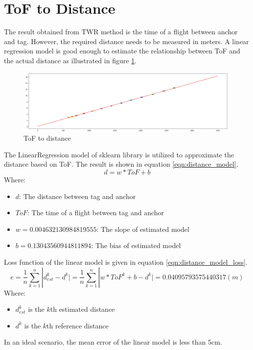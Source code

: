 \documentclass[\main/main.tex]{subfiles}
\begin{document}
\section{ToF to Distance}
The result obtained from TWR method is the time of a flight between anchor and tag. However, the required distance needs to be measured in meters. A linear regression model is good enough to estimate the relationship between ToF and the actual distance as illustrated in figure \ref{fig:tof_to_distance}.
\begin{figure}[H]
    \begin{center}
        \includegraphics[width=1\textwidth]{tof_to_distance.png}
    \end{center}
    \caption{ToF to distance}
    \label{fig:tof_to_distance}
\end{figure}
The LinearRegression model of sklearn library is utilized to approximate the distance based on ToF. The result is shown in equation \ref{eqn:distance_model}.
\begin{equation}
    d = w*ToF + b
    \label{eqn:distance_model}
\end{equation}
Where:
\begin{itemize}
    \item $d$: The distance between tag and anchor
    \item $ToF$: The time of a flight between tag and anchor
    \item $w = 0.004632130984819555$: The slope of estimated model 
    \item $b = 0.13043560944811894$: The bias of estimated model
\end{itemize}

Loss function of the linear model is given in equation \ref{eqn:distance_model_loss}.
\begin{equation}
    e = \frac{1}{n} \sum_{k = 1}^{n} | d^k_{est}-d^k \vert = \frac{1}{n} \sum_{k = 1}^{n} | w*ToF^k + b -d^k \vert  = 0.04095793575440317 (m)
    \label{eqn:distance_model_loss}
\end{equation}
Where:
\begin{itemize}
    \item $d^k_{est}$ is the $k$th estimated distance
    \item $d^k$ is the $k$th reference distance
\end{itemize}

In an ideal scenario, the mean error of the linear model is less than 5cm.
\end{document}
